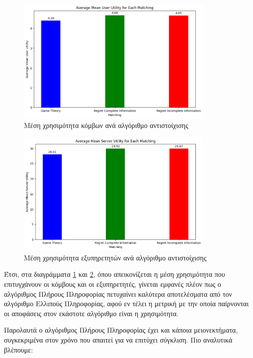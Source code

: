 \begin{figure}[H]
    \centering
    \includegraphics[width=0.85\textwidth]{figures/chapter4/Average_Mean_User_Utility.png}
    \caption{Μέση χρησιμότητα κόμβων ανά αλγόριθμο αντιστοίχισης}
    \label{fig27}
\end{figure}

\begin{figure}[H]
    \centering
    \includegraphics[width=0.85\textwidth]{figures/chapter4/Average_Mean_Server_Utility.png}
    \caption{Μέση χρησιμότητα εξυπηρετητών ανά αλγόριθμο αντιστοίχισης}
    \label{fig28}
\end{figure}

\newpage

Έτσι, στα διαγράμματα \ref{fig27} και \ref{fig28}, όπου απεικονίζεται η μέση χρησιμότητα που επιτυγχάνουν οι κόμβους και οι εξυπηρετητές, γίνεται εμφανές πλέον πως ο αλγόριθμος Πλήρους Πληροφορίας πετυχαίνει καλύτερα αποτελέσματα από τον αλγόριθμο Ελλιπούς Πληροφορίας, αφού εν τέλει η μετρική με την οποία παίρνονται οι αποφάσεις στον εκάστοτε αλγόριθμο είναι η χρησιμότητα. 

Παρολαυτά ο αλγόριθμος Πλήρους Πληροφορίας έχει και κάποια μειονεκτήματα, συγκεκριμένα στον χρόνο που απαιτεί για να επιτύχει σύγκλιση. Πιο αναλυτικά βλέπουμε:

